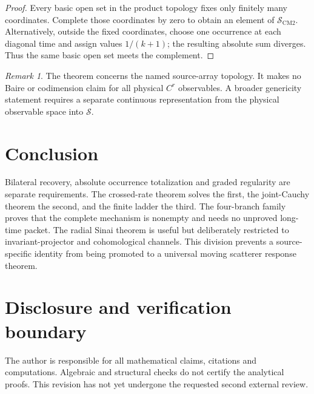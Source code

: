 \documentclass[11pt,reqno]{amsart}
\theoremstyle{definition}
\theoremstyle{remark}
\newtheorem{remark}[theorem]{Remark}
\begin{document}
\begin{proof}
Every basic open set in the product topology fixes only finitely many
coordinates.  Complete those coordinates by zero to obtain an element of
$\mathscr S_{\mathrm{CM2}}$.  Alternatively, outside the fixed coordinates,
choose one occurrence at each diagonal time and assign values
$1/(k+1)$; the resulting absolute sum diverges.  Thus the same basic open set
meets the complement.
\end{proof}

\begin{remark}
The theorem concerns the named source-array topology.  It makes no Baire or
codimension claim for all physical $C^r$ observables.  A broader genericity
statement requires a separate continuous representation from the physical
observable space into $\mathscr S$.
\end{remark}

\section{Conclusion}

Bilateral recovery, absolute occurrence totalization and graded regularity are
separate requirements.  The crossed-rate theorem solves the first, the
joint-Cauchy theorem the second, and the finite ladder the third.  The
four-branch family proves that the complete mechanism is nonempty and needs no
unproved long-time packet.  The radial Sinai theorem is useful but deliberately
restricted to invariant-projector and cohomological channels.  This division
prevents a source-specific identity from being promoted to a universal moving
scatterer response theorem.

\section*{Disclosure and verification boundary}
The author is responsible for all mathematical claims, citations and
computations.  Algebraic and structural checks do not certify the analytical
proofs.  This revision has not yet undergone the requested second external
review.



\end{document}
